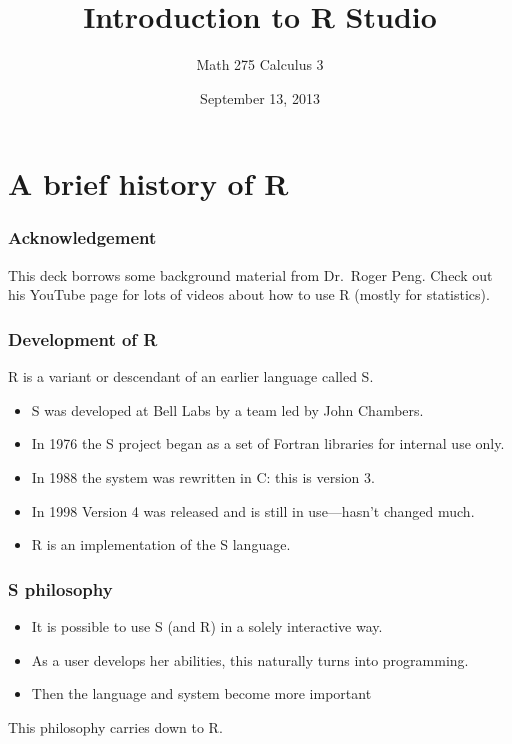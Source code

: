 \documentclass[11pt,ignorenonframetext,aspectratio=169]{beamer}
\title{Introduction to R Studio}
\author{Math 275 Calculus 3}
\date{September 13, 2013 }
\begin{document}
\frame{\titlepage}

\section{A brief history of R}

\begin{frame}\frametitle{Acknowledgement}

This deck borrows some background material from Dr.~Roger Peng. Check
out his YouTube page for lots of videos about how to use R (mostly for
statistics).

\end{frame}

\begin{frame}\frametitle{Development of R}

R is a variant or descendant of an earlier language called S.

\begin{itemize}[<+->]

\item
  S was developed at Bell Labs by a team led by John Chambers.
\item
  In 1976 the S project began as a set of Fortran libraries for internal
  use only.
\item
  In 1988 the system was rewritten in C: this is version 3.
\item
  In 1998 Version 4 was released and is still in use---hasn't changed
  much.
\item
  R is an implementation of the S language.
\end{itemize}

\end{frame}

\begin{frame}\frametitle{S philosophy}

\begin{itemize}[<+->]

\item
  It is possible to use S (and R) in a solely interactive way.
\item
  As a user develops her abilities, this naturally turns into
  programming.
\item
  Then the language and system become more important
\end{itemize}

This philosophy carries down to R.

\end{frame}
\end{document}
